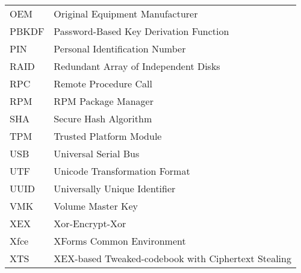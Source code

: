 \begin{longtable}{ll}
  OEM & Original Equipment Manufacturer \\
  PBKDF & Password-Based Key Derivation Function \\
  PIN & Personal Identification Number \\
  RAID & Redundant Array of Independent Disks \\
  RPC & Remote Procedure Call \\
  RPM & RPM Package Manager \\
  SHA & Secure Hash Algorithm \\
  TPM & Trusted Platform Module \\
  USB & Universal Serial Bus \\
  UTF & Unicode Transformation Format \\
  UUID & Universally Unique Identifier \\
  VMK & Volume Master Key \\
  XEX & Xor-Encrypt-Xor \\
  Xfce & XForms Common Environment \\
  XTS & XEX-based Tweaked-codebook with Ciphertext Stealing \\
\end{longtable}

